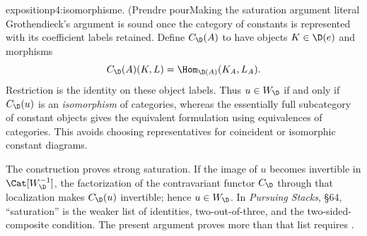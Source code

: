\begin{dcomment}{exposition}{p4:isomorphisme. (Prendre pour}{Making the saturation argument literal}
Grothendieck's argument is sound once the category of constants is represented with its coefficient labels retained. Define $C_{\D}(A)$ to have objects $K\in\D(e)$ and morphisms
\[
 C_{\D}(A)(K,L)=\Hom_{\D(A)}(K_A,L_A).
\]
Restriction is the identity on these object labels. Thus $u\in W_{\D}$ if and only if $C_{\D}(u)$ is an \emph{isomorphism} of categories, whereas the essentially full subcategory of constant objects gives the equivalent formulation using equivalences of categories. This avoids choosing representatives for coincident or isomorphic constant diagrams.

The construction proves strong saturation. If the image of $u$ becomes invertible in $\Cat[W_{\D}^{-1}]$, the factorization of the contravariant functor $C_{\D}$ through that localization makes $C_{\D}(u)$ invertible; hence $u\in W_{\D}$. In \emph{Pursuing Stacks}, \S64, ``saturation'' is the weaker list of identities, two-out-of-three, and the two-sided-composite condition. The present argument proves more than that list requires \citep[\S64, manuscript pp.~163--165]{Grothendieck1983}.
\end{dcomment}

